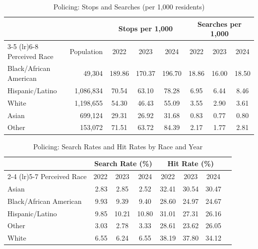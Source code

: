 
\begin{table}[H]
\centering
\caption{Policing: Stops and Searches (per 1,000 residents)}
\label{tab:stops_searches}
\begin{tabular}{l r ccc ccc}
\toprule
 & & \multicolumn{3}{c}{Stops per 1,000} & \multicolumn{3}{c}{Searches per 1,000} \\
\cmidrule(lr){3-5} \cmidrule(lr){6-8}
Perceived Race & Population & 2022 & 2023 & 2024 & 2022 & 2023 & 2024 \\
\midrule
Black/African American & 49,304 & 189.86 & 170.37 & 196.70 & 18.86 & 16.00 & 18.50 \\
Hispanic/Latino & 1,086,834 & 70.54 & 63.10 & 78.28 & 6.95 & 6.44 & 8.46 \\
White & 1,198,655 & 54.30 & 46.43 & 55.09 & 3.55 & 2.90 & 3.61 \\
Asian & 699,124 & 29.31 & 26.92 & 31.68 & 0.83 & 0.77 & 0.80 \\
Other & 153,072 & 71.51 & 63.72 & 84.39 & 2.17 & 1.77 & 2.81 \\
\bottomrule
\end{tabular}
\end{table}

\begin{table}[H]
\centering
\caption{Policing: Search Rates and Hit Rates by Race and Year}
\begin{tabular}{l r ccc ccc}
\toprule
 & \multicolumn{3}{c}{Search Rate (\%)} & \multicolumn{3}{c}{Hit Rate (\%)} \\
\cmidrule(lr){2-4} \cmidrule(lr){5-7}
Perceived Race & 2022 & 2023 & 2024 & 2022 & 2023 & 2024 \\
\midrule
Asian & 2.83 & 2.85 & 2.52 & 32.41 & 30.54 & 30.47 \\
Black/African American & 9.93 & 9.39 & 9.40 & 28.60 & 24.97 & 24.67 \\
Hispanic/Latino & 9.85 & 10.21 & 10.80 & 31.01 & 27.31 & 26.16 \\
Other & 3.03 & 2.78 & 3.33 & 28.61 & 23.62 & 26.05 \\
White & 6.55 & 6.24 & 6.55 & 38.19 & 37.80 & 34.12 \\
\bottomrule
\end{tabular}
\end{table}

